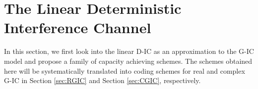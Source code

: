 \documentclass[12pt, draftclsnofoot, onecolumn]{IEEEtran}
\newcommand{\msf}[1]{\mathsf{#1}}
\newcommand{\SNR}{\msf{SNR}}
\newcommand{\INR}{\msf{INR}}
\newcommand{\E}{\mathbb{E}}
\theoremstyle{definition}
\begin{document}

%
%
%







\section{The Linear Deterministic Interference Channel}\label{sec:proposed}
In this section, we first look into the linear D-IC as an approximation to the G-IC model and propose a family of capacity achieving schemes. The schemes obtained here will be systematically translated into coding schemes for real and complex G-IC in Section \ref{sec:RGIC} and Section \ref{sec:CGIC}, respectively.
\end{document}

